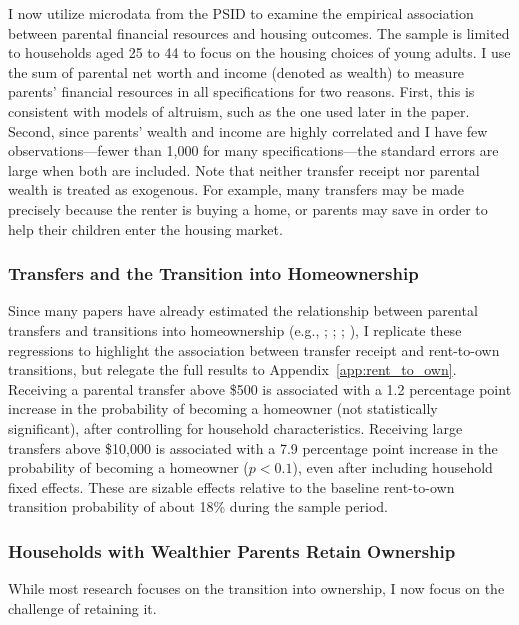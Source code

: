 \documentclass[12pt]{article}
\begin{document}
I now utilize microdata from the PSID to examine the empirical association between parental financial resources and housing outcomes. The sample is limited to households aged 25 to 44 to focus on the housing choices of young adults. I use the sum of parental net worth and income (denoted as wealth) to measure parents' financial resources in all specifications for two reasons. First, this is consistent with models of altruism, such as the one used later in the paper. Second, since parents' wealth and income are highly correlated and I have few observations---fewer than 1,000 for many specifications---the standard errors are large when both are included. Note that neither transfer receipt nor parental wealth is treated as exogenous. For example, many transfers may be made precisely because the renter is buying a home, or parents may save in order to help their children enter the housing market. 

\subsubsection{Transfers and the Transition into Homeownership}
Since many papers have already estimated the relationship between parental transfers and transitions into homeownership (e.g., \citealp{wold2024housing}; \citealp{Blickle2019}; \citealp{benetton2022dynastic}; \citealp{Lee2018}), I replicate these regressions to highlight the association between transfer receipt and rent-to-own transitions, but relegate the full results to Appendix~\ref{app:rent_to_own}. Receiving a parental transfer above \$500 is associated with a 1.2 percentage point increase in the probability of becoming a homeowner (not statistically significant), after controlling for household characteristics. Receiving large transfers above \$10,000 is associated with a 7.9 percentage point increase in the probability of becoming a homeowner ($p<0.1$), even after including household fixed effects. These are sizable effects relative to the baseline rent-to-own transition probability of about 18\% during the sample period.


\subsubsection{Households with Wealthier Parents Retain Ownership}\label{sec:maintaining}
While most research focuses on the transition into ownership, I now focus on the challenge of retaining it.
\end{document}
